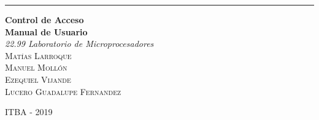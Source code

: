 %
%
%
% 
%
%
%





\begin{titlepage} %
	\raggedleft %
	
	\rule{1pt}{\textheight} %
	\hspace{0.05\textwidth} %
	\parbox[b]{0.75\textwidth}{ %
		
		{\Huge\bfseries Control de Acceso \\[0.5\baselineskip] Manual de Usuario}\\[2\baselineskip] %
		{\large\textit{22.99 Laboratorio de Microprocesadores}}\\[4\baselineskip] %
        {\Large\textsc{Matías Larroque}}\\ %
        {\Large\textsc{Manuel Mollón}}\\
        {\Large\textsc{Ezequiel Vijande}}\\
        {\Large\textsc{Lucero Guadalupe Fernandez}}
		\vspace{0.5\textheight} %
		
		{\noindent ITBA - 2019}\\[\baselineskip] %
	}

\end{titlepage}

